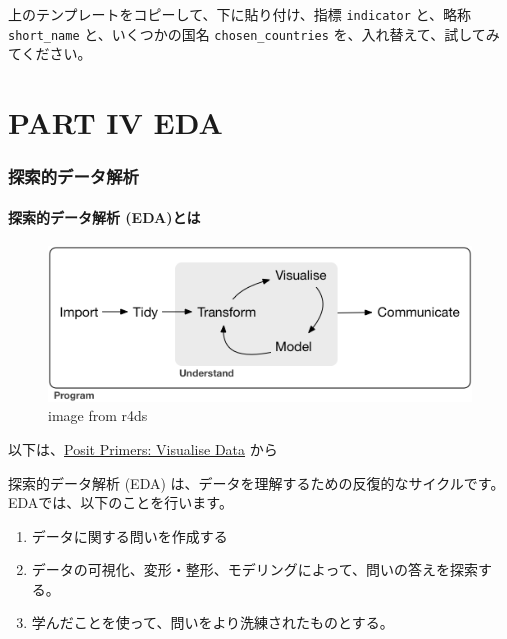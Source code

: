 \documentclass[
]{bxjsbook}
\theoremstyle{definition}
\theoremstyle{definition}
\theoremstyle{definition}
\theoremstyle{definition}
\theoremstyle{remark}
\begin{document}
上のテンプレートをコピーして、下に貼り付け、指標 \texttt{indicator} と、略称 \texttt{short\_name} と、いくつかの国名 \texttt{chosen\_countries} を、入れ替えて、試してみてください。

\hypertarget{part-part-iv-eda}{%
\part{PART IV EDA}\label{part-part-iv-eda}}

\hypertarget{intro2eda}{%
\section{探索的データ解析}\label{intro2eda}}

\hypertarget{ux63a2ux7d22ux7684ux30c7ux30fcux30bfux89e3ux6790-edaux3068ux306f}{%
\subsection{探索的データ解析 (EDA)とは}\label{ux63a2ux7d22ux7684ux30c7ux30fcux30bfux89e3ux6790-edaux3068ux306f}}

\begin{figure}
\centering
\includegraphics{./data/data-science.png}
\caption{image from r4ds}
\end{figure}

以下は、\href{https://posit.cloud/learn/primers/3.1}{Posit Primers: Visualise Data} から

探索的データ解析 (EDA) は、データを理解するための反復的なサイクルです。EDAでは、以下のことを行います。

\begin{enumerate}
\def\labelenumi{\arabic{enumi}.}
\item
  データに関する問いを作成する
\item
  データの可視化、変形・整形、モデリングによって、問いの答えを探索する。
\item
  学んだことを使って、問いをより洗練されたものとする。
\end{enumerate}
\end{document}
